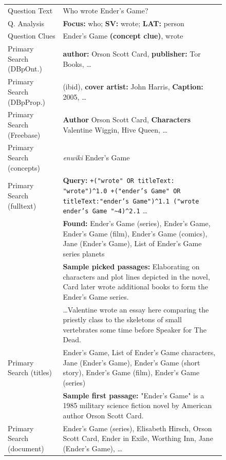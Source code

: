 \documentclass{poster15}
\begin{document}
\begin{figure}[t!]
\renewcommand{\arraystretch}{1.3}
\centering
\footnotesize
\begin{tabular}{|p{1.8cm}p{6cm}|}
\hline
Question Text & Who wrote Ender's Game? \\
Q. Analysis & \textbf{Focus:} who; \textbf{SV:} wrote; \textbf{LAT:} person \\
Question Clues & Ender's Game \textbf{(concept clue)}, wrote \\ \hline

Primary Search (DBpOnt.) & \textbf{author:} Orson Scott Card, \textbf{publisher:} Tor Books, \dots \\
Primary Search (DBpProp.) & (ibid), \textbf{cover artist:} John Harris, \textbf{Caption:} 2005, \dots \\
Primary Search (Freebase) & \textbf{Author} Orson Scott Card, \textbf{Characters} Valentine Wiggin, Hive Queen, \dots \\
Primary Search (concepts) & \textit{enwiki} Ender's Game \\
Primary Search (fulltext) %
	& \textbf{Query:} \texttt{+("wrote" OR titleText: "wrote")\^{}1.0 +("ender's Game" OR titleText:"ender's Game")\^{}1.1  ("wrote ender's Game "\textasciitilde4)\^{}2.1} \dots \\
	& \textbf{Found:} Ender's Game (series), Ender's Game, Ender's Game (film), Ender's Game (comics), Jane (Ender's Game), List of Ender's Game series planets \\
	& \textbf{Sample picked passages:} {\footnotesize Elaborating on characters and plot lines depicted in the novel, Card later wrote additional books to form the Ender's Game series.} \\
	& \dots {\footnotesize Valentine wrote an essay here comparing the priestly class to the skeletons of small vertebrates some time before Speaker for The Dead.} \\
Primary Search (titles) & Ender's Game, List of Ender's Game characters, Jane (Ender's Game), Ender's Game (short story), Ender's Game (film), Ender's Game (series) \\
	& \textbf{Sample first passage:} {\footnotesize "Ender's Game" is a 1985 military science fiction novel by American author Orson Scott Card.} \\
Primary Search (document) & Ender's Game (series), Elisabeth Hirsch, Orson Scott Card, Ender in Exile, Worthing Inn, Jane (Ender's Game), \dots \\ \hline


\end{tabular}
\end{figure}
\end{document}
